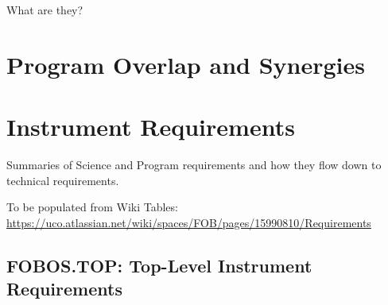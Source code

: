 \documentclass[11pt,a4paper,twoside,onecolumn,openany,final,oldfontcommands]{memoir}
\begin{document}
What are they?

\newpage


\chapter{Program Overlap and Synergies}


\newpage


\chapter{Instrument Requirements}

Summaries of Science and Program requirements and how they flow down to technical requirements.

To be populated from Wiki Tables: \url{https://uco.atlassian.net/wiki/spaces/FOB/pages/15990810/Requirements}

\section{FOBOS.TOP: Top-Level Instrument Requirements}
\end{document}
